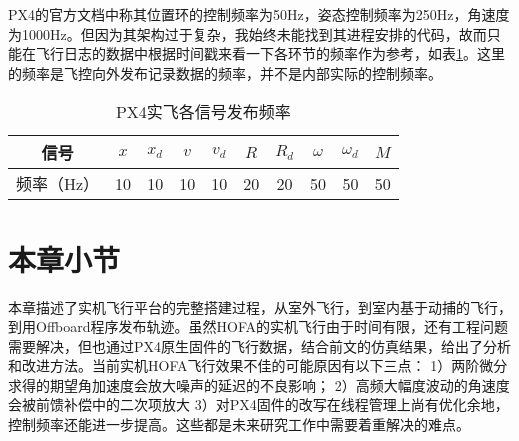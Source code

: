 PX4的官方文档中称其位置环的控制频率为50Hz，姿态控制频率为250Hz，角速度为1000Hz\cite{px4控制}。但因为其架构过于复杂，我始终未能找到其进程安排的代码，故而只能在飞行日志的数据中根据时间戳来看一下各环节的频率作为参考，如表\ref{频率}。这里的频率是飞控向外发布记录数据的频率，并不是内部实际的控制频率。
\begin{table}[!h]
  \centering
  \caption{PX4实飞各信号发布频率}
  \label{频率}
  \begin{tabular}{cccccccccc}
      \toprule
      信号&$x$ & $x_d$ & $v$ &$v_d$ &$R$ &$R_d$& $\omega$ &$\omega_d$ &$M$\\
      \midrule
频率（Hz）&10& 10& 10& 10& 20&20& 50 & 50&50\\
      \bottomrule
  \end{tabular}
\end{table}


\section{本章小节}
本章描述了实机飞行平台的完整搭建过程，从室外飞行，到室内基于动捕的飞行，到用Offboard程序发布轨迹。虽然HOFA的实机飞行由于时间有限，还有工程问题需要解决，但也通过PX4原生固件的飞行数据，结合前文的仿真结果，给出了分析和改进方法。当前实机HOFA飞行效果不佳的可能原因有以下三点：
1）两阶微分求得的期望角加速度会放大噪声的延迟的不良影响；
2）高频大幅度波动的角速度会被前馈补偿中的二次项放大
3）对PX4固件的改写在线程管理上尚有优化余地，控制频率还能进一步提高。这些都是未来研究工作中需要着重解决的难点。

